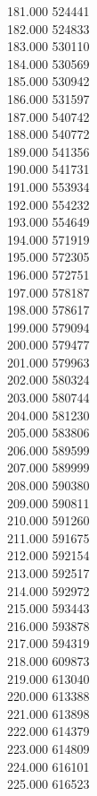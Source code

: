 { 181.000	524441 \\
 182.000	524833 \\
 183.000	530110 \\
 184.000	530569 \\
 185.000	530942 \\
 186.000	531597 \\
 187.000	540742 \\
 188.000	540772 \\
 189.000	541356 \\
 190.000	541731 \\
 191.000	553934 \\
 192.000	554232 \\
 193.000	554649 \\
 194.000	571919 \\
 195.000	572305 \\
 196.000	572751 \\
 197.000	578187 \\
 198.000	578617 \\
 199.000	579094 \\
 200.000	579477 \\
 201.000	579963 \\
 202.000	580324 \\
 203.000	580744 \\
 204.000	581230 \\
 205.000	583806 \\
 206.000	589599 \\
 207.000	589999 \\
 208.000	590380 \\
 209.000	590811 \\
 210.000	591260 \\
 211.000	591675 \\
 212.000	592154 \\
 213.000	592517 \\
 214.000	592972 \\
 215.000	593443 \\
 216.000	593878 \\
 217.000	594319 \\
 218.000	609873 \\
 219.000	613040 \\
 220.000	613388 \\
 221.000	613898 \\
 222.000	614379 \\
 223.000	614809 \\
 224.000	616101 \\
 225.000	616523 \\
}

